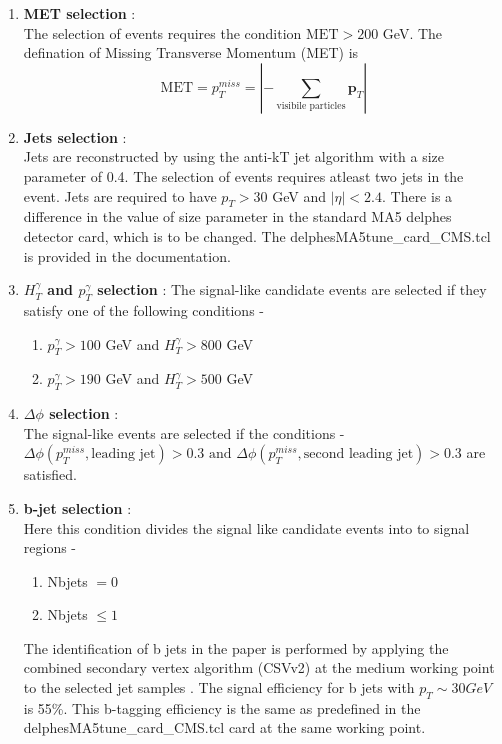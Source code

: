 \documentclass[a4paper, 10pt]{article}
\renewcommand{\vec}[1]{\mathbf{#1}}
\begin{document}
\begin{enumerate}
\item \textbf{MET selection} : \\
The selection of events requires the condition $\text{MET} > 200$ GeV. The defination of Missing Transverse Momentum (MET) is $$ \text{MET} =  p_{T}^{miss} = | -\sum_{\text{visibile particles}} \vec{p}_{T}  | $$
\pagebreak
\item \textbf{Jets selection} : \\
Jets are reconstructed by using the anti-kT \cite{antikt} jet algorithm with a size parameter of 0.4. 
The selection of events requires atleast two jets in the event. Jets are required to have $p_T > 30$ GeV and $|\eta| < 2.4$. There is a difference in the value of size parameter in the standard MA5 delphes detector card, which is to be changed. The delphesMA5tune\_card\_CMS.tcl is provided in the documentation.
\item  \textbf{$H_{T}^{\gamma}$ and $p_{T}^{\gamma}$ selection} :
The signal-like candidate events are selected if they satisfy one of the following conditions - 
\begin{enumerate}
\item $p_{T}^{\gamma} > 100$ GeV and $H_{T}^{\gamma} > 800$ GeV
\item $p_{T}^{\gamma} > 190$ GeV and $H_{T}^{\gamma} > 500$ GeV 
\end{enumerate}

\item \textbf{$\Delta\phi$ selection} : \\
The signal-like events are selected if the conditions - $\Delta\phi(p_{T}^{miss},\text{leading jet}) > 0.3 \text{ and } \Delta\phi(p_{T}^{miss},\text{second leading jet}) > 0.3$ are satisfied.  
 
\item \textbf{b-jet selection} : \\
Here this condition divides the signal like candidate events into to signal regions - 
\begin{enumerate}
\item Nbjets $= 0$
\item Nbjets $\leq 1 $
\end{enumerate} 
The identification of b jets in the paper \cite{paper} is performed by applying the combined secondary vertex algorithm (CSVv2) at the medium working point to the selected jet samples \cite{btag}. The signal efficiency for b jets with $p_T \sim 30 GeV$ is 55\%. This b-tagging efficiency is the same as predefined in the delphesMA5tune\_card\_CMS.tcl card at the same working point.  
\end{enumerate} 
\end{document}
